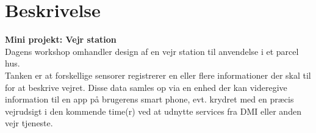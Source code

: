 \documentclass[11pt]{article}
\renewcommand{\baselinestretch}{1.20}
\begin{document}
    

    \renewcommand{\baselinestretch}{0.8} 
    \tableofcontents
    \renewcommand{\baselinestretch}{1.20} 
    
    \section{Beskrivelse}
    \textbf{Mini projekt: Vejr station}\\
    Dagens workshop omhandler design af en vejr station til anvendelse i et parcel hus. \\
    Tanken er at forskellige sensorer registrerer en eller flere informationer der skal til for at beskrive
    vejret. Disse data samles op via en enhed der kan videregive information til en app på brugerens smart
    phone, evt. krydret med en præcis vejrudsigt i den kommende time(r) ved at udnytte services fra DMI
    eller anden vejr tjeneste.

    \newpage
    
    
    
\end{document}
